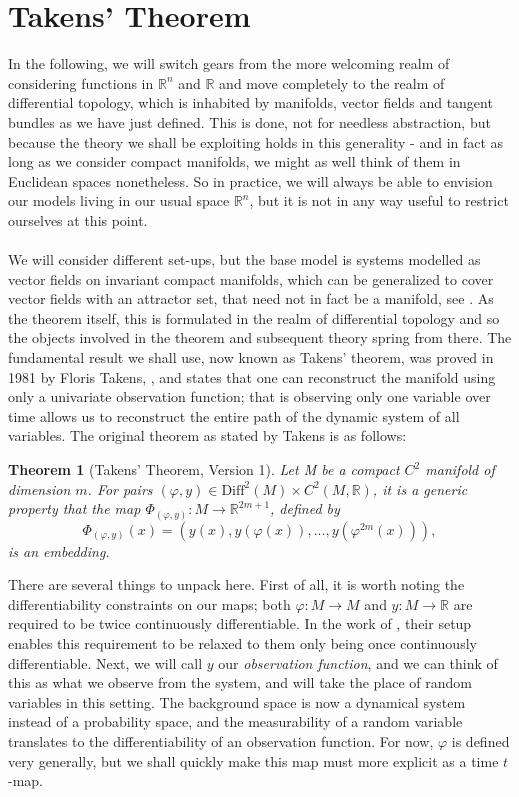 \documentclass[11pt, a4paper]{memoir}
\theoremstyle{break}
\newtheorem{thm}{Theorem}
\theoremstyle{break}
\theoremstyle{nonumberplain}
\newcommand{\mR}{\mathbb{R}}
\begin{document}
\section{Takens' Theorem}
In the following, we will switch gears from the more welcoming realm of considering functions in $\mR^n$ and $\mR$ and move completely to the realm of differential topology, which is inhabited by manifolds, vector fields and tangent bundles as we have just defined. This is done, not for needless abstraction, but because the theory we shall be exploiting holds in this generality - and in fact as long as we consider compact manifolds, we might as well think of them in Euclidean spaces nonetheless. So in practice, we will always be able to envision our models living in our usual space $\mR^n$, but it is not in any way useful to restrict ourselves at this point.\\\\
We will consider different set-ups, but the base model is systems modelled as vector fields on invariant compact manifolds, which can be generalized to cover vector fields with an attractor set, that need not in fact be a manifold, see \cite{Sauer1991}. As the theorem itself, this is formulated in the realm of differential topology and so the objects involved in the theorem and subsequent theory spring from there. The fundamental result we shall use, now known as Takens' theorem, was proved in 1981 by Floris Takens, \cite{Takens}, and states that one can reconstruct the manifold using only a univariate observation function; that is observing only one variable over time allows us to reconstruct the entire path of the dynamic system of all variables. The original theorem as stated by Takens is as follows:
\begin{thm}[Takens' Theorem, Version 1]
Let M be a compact $C^2$ manifold of dimension $m$. For pairs $(\varphi,y)\in \text{Diff}^2(M)\times C^2(M,\mathbb{R})$, it is a generic property that the map $\Phi_{(\varphi,y)}:M\to \mathbb{R}^{2m+1}$, defined by
$$\Phi_{(\varphi,y)}(x)=(y(x),y(\varphi(x)),...,y(\varphi^{2m}(x))),$$
is an embedding. \cite{Takens}
\end{thm}
There are several things to unpack here. First of all, it is worth noting the differentiability constraints on our maps; both $\varphi: M\to M$ and $y:M\to\mR$ are required to be twice continuously differentiable. In the work of \cite{Sauer1991}, their setup enables this requirement to be relaxed to them only being once continuously differentiable. Next, we will call $y$ our \textit{observation function}, and we can think of this as what we observe from the system, and will take the place of random variables in this setting. The background space is now a dynamical system instead of a probability space, and the measurability   of a random variable translates to the differentiability of an observation function. For now, $\varphi$ is defined very generally, but we shall quickly make this map must more explicit as a time $t$-map.\\\\
\end{document}
